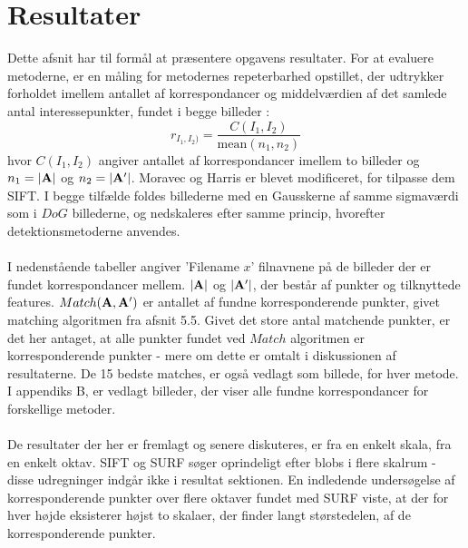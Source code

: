 \chapter{Resultater}
\label{sec:resultater}
Dette afsnit har til formål at præsentere opgavens resultater. For at evaluere metoderne, er en måling for metodernes repeterbarhed opstillet, der udtrykker forholdet imellem antallet af korrespondancer og middelværdien af det samlede antal interessepunkter, fundet i begge billeder \cite{eval}:
\begin{equation}
r_{I_1,I_2)}=\dfrac{C(I_1,I_2)}{\text{mean}(n_1,n_2)}
\end{equation}
hvor $C(I_1,I_2)$ angiver antallet af korrespondancer imellem to billeder og $n_1=\bold{|A|}$ og $n_2=\bold{|A'|}$.
Moravec og Harris er blevet modificeret, for tilpasse dem SIFT. I begge tilfælde foldes billederne med en Gausskerne af samme sigmaværdi som i $DoG$ billederne, og nedskaleres efter samme princip, hvorefter detektionsmetoderne anvendes. 
\\
\\
I nedenstående tabeller angiver 'Filename $x$' filnavnene på de billeder der er fundet korrespondancer mellem. $|\bold{A}|$ og $|\bold{A'}|$, der består af punkter og tilknyttede features. $Match(\bold{A}, \bold{A'})$ er antallet af fundne korresponderende punkter, givet matching algoritmen fra afsnit 5.5. Givet det store antal matchende punkter, er det her antaget, at alle punkter fundet ved $Match$ algoritmen er korresponderende punkter - mere om dette er omtalt i diskussionen af resultaterne. De 15 bedste matches, er også vedlagt som billede, for hver metode. I appendiks B, er vedlagt billeder, der viser alle fundne korrespondancer for forskellige metoder.
\\
\\
De resultater der her er fremlagt og senere diskuteres, er fra en enkelt skala, fra en enkelt oktav. SIFT og SURF søger oprindeligt efter blobs i flere skalrum - disse udregninger indgår ikke i resultat sektionen. En indledende undersøgelse af korresponderende punkter over flere oktaver fundet med SURF viste, at der for hver højde eksisterer højst to skalaer, der finder langt størstedelen, af de korresponderende punkter.
\newpage
